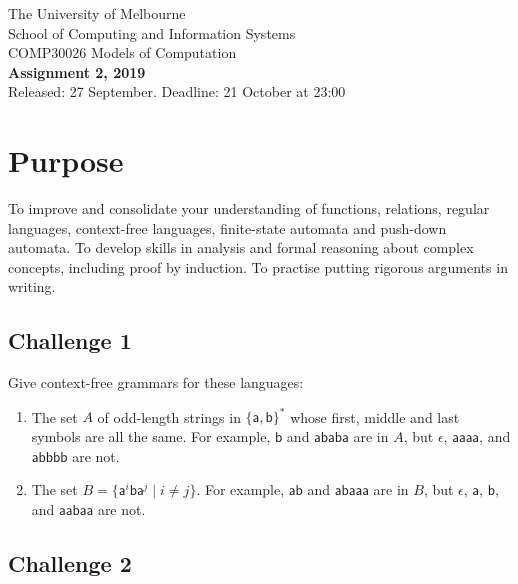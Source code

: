 \documentclass[12pt]{article}
\newcommand{\ma}{\mathsf{a}}
\newcommand{\mb}{\mathsf{b}}
\begin{document}
\begin{center}
{\sc The University of Melbourne
\\
School of Computing and Information Systems
\\ 
COMP30026 Models of Computation}
\bigskip \\
{\Large\bf Assignment 2, 2019}
\bigskip \\
{\large Released: 27 September.  Deadline: 21 October at 23:00}
\end{center}

\section*{Purpose}
To improve and consolidate your understanding of functions,
relations, regular languages, context-free languages, 
finite-state automata and push-down automata.
To develop skills in analysis and formal reasoning about
complex concepts, including proof by induction.
To practise putting rigorous arguments in writing.

\subsection*{Challenge 1}

Give context-free grammars for these languages:
\begin{enumerate}
\item
The set $A$ of odd-length strings in $\{\ma,\mb\}^*$ whose first, 
middle and last symbols are all the same.
For example, $\mb$ and $\ma \mb \ma \mb \ma$ are in $A$,
but $\epsilon$, $\ma \ma \ma \ma$, and $\ma \mb \mb \mb \mb$ are not.
\item
The set $B = \{\ma^i \mb \ma^j \mid i \not= j\}$.
For example, $\ma \mb$ and $\ma \mb \ma \ma \ma$ are in $B$,
but $\epsilon$, $\ma$, $\mb$, and $\ma \ma \mb \ma \ma$ are not.
\end{enumerate}

\subsection*{Challenge 2}
\end{document}
